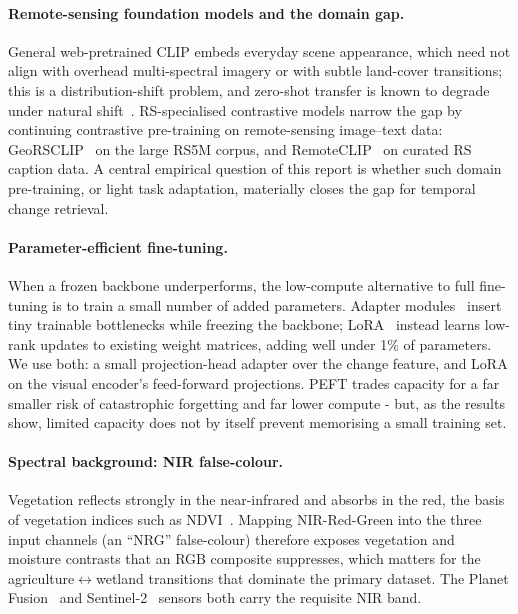 \documentclass{article}
\begin{document}
\paragraph{Remote-sensing foundation models and the domain gap.}
General web-pretrained CLIP embeds everyday scene appearance, which need not
align with overhead multi-spectral imagery or with subtle land-cover
transitions; this is a distribution-shift problem, and zero-shot transfer is
known to degrade under natural shift~\cite{distshift}. RS-specialised
contrastive models narrow the gap by continuing contrastive pre-training on
remote-sensing image--text data: GeoRSCLIP~\cite{georsclip} on the large RS5M
corpus, and RemoteCLIP~\cite{remoteclip} on curated RS caption data. A central
empirical question of this report is whether such domain pre-training, or
light task adaptation, materially closes the gap for temporal change retrieval.

\paragraph{Parameter-efficient fine-tuning.}
When a frozen backbone underperforms, the low-compute alternative to full
fine-tuning is to train a small number of added parameters. Adapter
modules~\cite{peftadapters} insert tiny trainable bottlenecks while freezing the
backbone; LoRA~\cite{lora} instead learns low-rank updates to existing weight
matrices, adding well under 1\% of parameters. We use both: a small
projection-head adapter over the change feature, and LoRA on the visual
encoder's feed-forward projections. PEFT trades capacity for a far smaller risk
of catastrophic forgetting and far lower compute - but, as the results show,
limited capacity does not by itself prevent memorising a small training set.

\paragraph{Spectral background: NIR false-colour.}
Vegetation reflects strongly in the near-infrared and absorbs in the red, the
basis of vegetation indices such as NDVI~\cite{vegindex}. Mapping
NIR-Red-Green into the three input channels (an ``NRG'' false-colour) therefore
exposes vegetation and moisture contrasts that an RGB composite suppresses,
which matters for the agriculture$\leftrightarrow$wetland transitions that
dominate the primary dataset. The Planet Fusion~\cite{planetfusion} and
Sentinel-2~\cite{sentinel2} sensors both carry the requisite NIR band.
\end{document}
